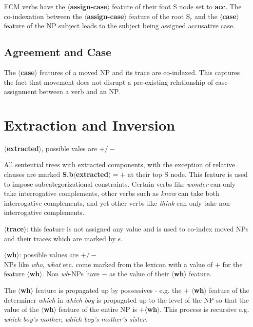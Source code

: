 ECM verbs have the {\bf $\langle$assign-case$\rangle$}  feature of their
foot S node set to {\bf acc}. The co-indexation between the 
{\bf $\langle$assign-case$\rangle$} feature of
the root S$_{r}$ and the {\bf $\langle$case$\rangle$} feature of the NP subject
leads to the subject being assigned accusative case.

\subsection{Agreement and Case}
The {\bf $\langle$case$\rangle$} features of a moved NP and its trace 
are co-indexed. This captures the fact that movement does not disrupt 
a pre-existing relationship of case-assignment between a verb and an NP.



\section{Extraction and Inversion}
{\bf $\langle$extracted$\rangle$}, possible vales are {\bf $+/-$}

All sentential trees with extracted components, with the
exception of relative clauses
are marked {\bf S.b$\langle$extracted$\rangle = +$} at their top S node. 
This feature is used to impose subcategorizational constraints. 
Certain verbs like {\em wonder} can only take interrogative complements,
other verbs such as {\em know} can take both interrogative complements,
and yet other verbs like {\em think} can only take non-interrogative complements.

{\bf $\langle$trace$\rangle$}: this feature is not assigned any value and
is used to co-index moved NPs and their traces which are marked by
$\epsilon$.

{\bf $\langle$wh$\rangle$}: possible values are {\bf $+/-$}\\
NPs like {\em who}, {\em what} etc. come marked
from the lexicon  with a value of {\bf $+$} for the feature {\bf $\langle$wh$\rangle$}.
Non {\em wh}-NPs have {\bf $-$} as the value of their 
{\bf $\langle$wh$\rangle$} feature. 

The {\bf $\langle$wh$\rangle$} feature
is propagated up by possessives -  e.g. the $+$ {\bf $\langle$wh$\rangle$}
feature of the determiner {\em which} in {\em which boy} is propagated up
to the level of the NP so that the value of the {\bf $\langle$wh$\rangle$} feature
of the entire NP is $+${\bf $\langle$wh$\rangle$}. This process is recursive
e.g. {\em which boy's mother}, {\em which boy's mother's sister}. 

